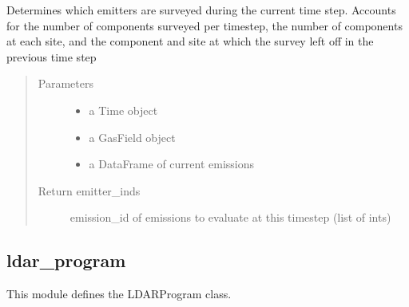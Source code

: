 \documentclass[letterpaper,10pt,english]{sphinxmanual}
\begin{document}
\begin{fulllineitems}

\begin{fulllineitems}
\label{\detokenize{index:feast.DetectionModules.comp_survey.CompSurvey.emitters_surveyed}}
Determines which emitters are surveyed during the current time step.
Accounts for the number of components surveyed per timestep, the number of components at each site, and the
component and site at which the survey left off in the previous time step
\begin{quote}\begin{description}
\item[{Parameters}] \leavevmode\begin{itemize}
\item {} 
 \textendash{} a Time object

\item {} 
 \textendash{} a GasField object

\item {} 
 \textendash{} a DataFrame of current emissions

\end{itemize}

\item[{Return emitter\_inds}] \leavevmode
emission\_id of emissions to evaluate at this timestep (list of ints)

\end{description}\end{quote}

\end{fulllineitems}


\end{fulllineitems}



\subsection{ldar\_program}
\label{\detokenize{index:module-feast.DetectionModules.ldar_program}}\label{\detokenize{index:ldar-program}}
This module defines the LDARProgram class.
\end{document}
